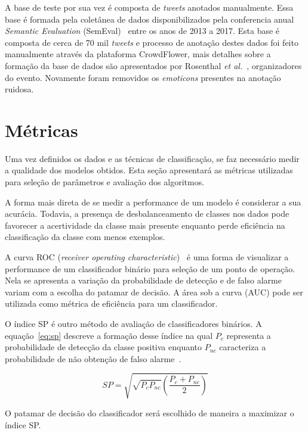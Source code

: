 A base de teste por sua vez é composta de \textit{tweets} anotados manualmente.
Essa base é formada pela coletânea de dados disponibilizados pela conferencia anual \textit{Semantic Evaluation}
(SemEval)~\cite{semeval17} entre os anos de 2013 a 2017.
Esta base é composta de cerca de 70 mil \textit{tweets} e processo de anotação destes dados foi feito manualmente
através da plataforma CrowdFlower, mais detalhes sobre a formação da base de dados são apresentados por Rosenthal
\textit{et al.}~\cite{rosenthal17}, organizadores do evento.
Novamente foram removidos os \textit{emoticons} presentes na anotação ruidosa.

\section{Métricas} \label{sec:metrics}

Uma vez definidos os dados e as técnicas de classificação, se faz necessário medir a qualidade dos modelos obtidos.
Esta seção apresentará as métricas utilizadas para seleção de parâmetros e avaliação dos algoritmos.

A forma mais direta de se medir a performance de um modelo é considerar a sua acurácia.
Todavia, a presença de desbalanceamento de classes nos dados pode favorecer a acertividade da classe mais presente
enquanto perde eficiência na classificação da classe com menos exemplos.

A curva ROC (\textit{receiver operating characteristic})~\cite{bradley97} é uma forma de visualizar a performance de um
classificador binário para seleção de um ponto de operação.
Nela se apresenta a variação da probabilidade de detecção e de falso alarme variam com a escolha do patamar de decisão.
A área sob a curva (AUC) pode ser utilizada como métrica de eficiência para um classificador.

O índice SP é outro método de avaliação de classificadores binários.
A equação~\ref{eq:sp} descreve a formação desse índice na qual $P_c$ representa a probabilidade de detecção da classe
positiva enquanto $P_{nc}$ caracteriza a probabilidade de não obtenção de falso alarme~\cite{ciodaro12}.

\begin{equation} \label{eq:sp}
    SP = \sqrt{\sqrt{P_c P_{nc}}(\frac{P_c + P_{nc}}{2})}
\end{equation}

O patamar de decisão do classificador será escolhido de maneira a maximizar o índice SP.

